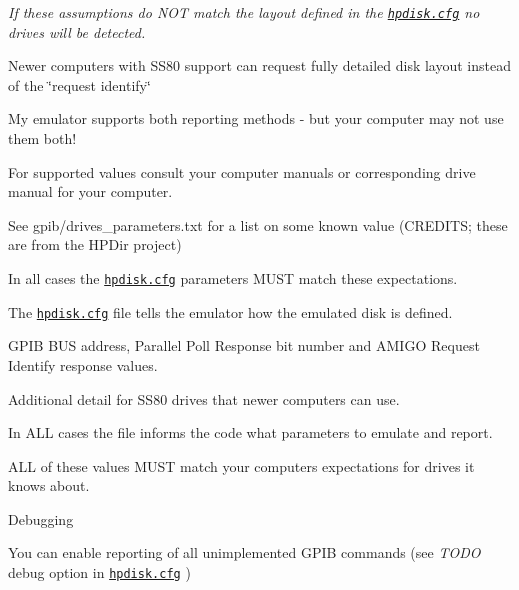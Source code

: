 \begin{DoxyItemize}
\begin{DoxyItemize}
\begin{DoxyItemize}
\begin{DoxyItemize}
\item {\itshape If these assumptions do N\+OT match the layout defined in the \href{sdcard/hpdisk.cfg}{\tt hpdisk.\+cfg} no drives will be detected.}
\end{DoxyItemize}
\end{DoxyItemize}
\item Newer computers with S\+S80 support can request fully detailed disk layout instead of the \char`\"{}request identify\char`\"{}
\item My emulator supports both reporting methods -\/ but your computer may not use them both!
\begin{DoxyItemize}
\item For supported values consult your computer manuals or corresponding drive manual for your computer.
\begin{DoxyItemize}
\item See gpib/drives\+\_\+parameters.\+txt for a list on some known value (C\+R\+E\+D\+I\+TS; these are from the H\+P\+Dir project)
\end{DoxyItemize}
\item In all cases the \href{sdcard/hpdisk.cfg}{\tt hpdisk.\+cfg} parameters M\+U\+ST match these expectations.
\end{DoxyItemize}
\item The \href{sdcard/hpdisk.cfg}{\tt hpdisk.\+cfg} file tells the emulator how the emulated disk is defined.
\begin{DoxyItemize}
\item G\+P\+IB B\+US address, Parallel Poll Response bit number and A\+M\+I\+GO Request Identify response values.
\item Additional detail for S\+S80 drives that newer computers can use.
\item In A\+LL cases the file informs the code what parameters to emulate and report.
\begin{DoxyItemize}
\item A\+LL of these values M\+U\+ST match your computers expectations for drives it knows about.
\end{DoxyItemize}
\end{DoxyItemize}
\item Debugging
\begin{DoxyItemize}
\item You can enable reporting of all unimplemented G\+P\+IB commands (see {\itshape T\+O\+DO} debug option in \href{sdcard/hpdisk.cfg}{\tt hpdisk.\+cfg} )
\begin{DoxyItemize}

\end{DoxyItemize}
\end{DoxyItemize}
\end{DoxyItemize}
\end{DoxyItemize}
